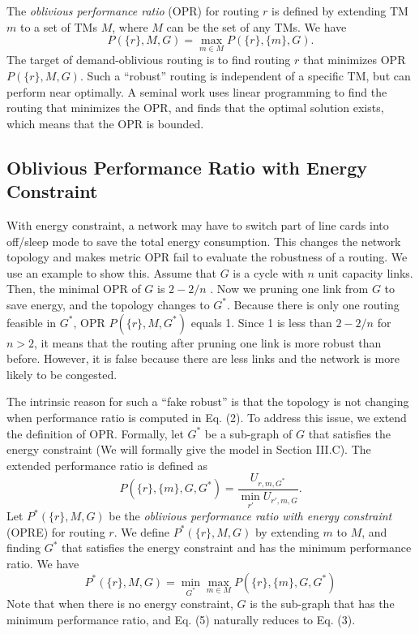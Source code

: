 \documentclass[conference]{IEEEtran}
\begin{document}
The \emph{oblivious performance ratio} (OPR) for routing $r$ is defined by extending TM $m$ to a set of TMs $M$, where $M$ can be the set of any TMs. We have
\begin{equation}
	P(\{ r \}, M, G) = \max_{m\in M} P(\{ r \}, \{ m \}, G).
\end{equation}
The target of demand-oblivious routing is to find routing $r$ that minimizes OPR $P(\{ r \}, M, G)$. Such a ``robust'' routing is independent of a specific TM, but can perform near optimally. A seminal work \cite{networking:oblivious} uses linear programming to find the routing that minimizes the OPR, and finds that the optimal solution exists, which means that the OPR is bounded.

\subsection{Oblivious Performance Ratio with Energy Constraint}

With energy constraint, a network may have to switch part of line cards into off/sleep mode to save the total energy consumption. This changes the network topology and makes metric OPR fail to evaluate the robustness of a routing. We use an example to show this. Assume that $G$ is a cycle with $n$ unit capacity links. Then, the minimal OPR of $G$ is $2-2/n$ \cite{networking:oblivious}. Now we pruning one link from $G$ to save energy, and the topology changes to $G^*$. Because there is only one routing feasible in $G^*$, OPR $P(\{ r \}, M, G^*)$ equals 1. Since 1 is less than $2-2/n$ for $n > 2$, it means that the routing after pruning one link is more robust than before. However, it is false because there are less links and the network is more likely to be congested.

The intrinsic reason for such a ``fake robust'' is that the topology is not changing when performance ratio is computed in Eq. (2). To address this issue, we extend the definition of OPR. Formally, let $G^*$ be a sub-graph of $G$ that satisfies the energy constraint (We will formally give the model in Section III.C). The extended performance ratio is defined as
\begin{equation}
	P(\{ r \},\{ m \}, G, G^*) = \frac{U_{r,m,G^*}}{\min_{r'} U_{r', m, G}}.
\end{equation}
Let $P^*(\{ r \}, M, G)$ be the \emph{oblivious performance ratio with energy constraint} (OPRE) for routing $r$. We define $P^*(\{ r \}, M, G)$ by extending $m$ to $M$, and finding $G^*$ that satisfies the energy constraint and has the minimum performance ratio. We have
\begin{equation}
	P^*(\{ r \}, M, G) = \min_{G^*} \max_{m\in M} P(\{ r \}, \{ m \}, G, G^*)
\end{equation}
Note that when there is no energy constraint, $G$ is the sub-graph that has the minimum performance ratio, and Eq. (5) naturally reduces to Eq. (3).
\end{document}
